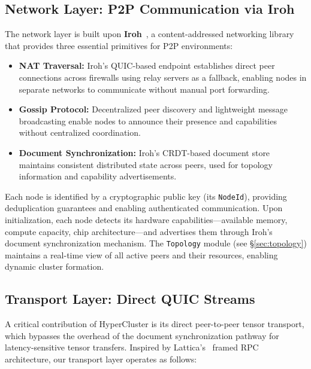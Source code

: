 \documentclass[runningheads]{llncs}
\begin{document}
\subsection{Network Layer: P2P Communication via Iroh}
\label{sec:network}

The network layer is built upon \textbf{Iroh}~\cite{iroh2024}, a content-addressed networking library that provides three essential primitives for P2P environments:

\begin{itemize}
    \item \textbf{NAT Traversal:} Iroh's QUIC-based endpoint establishes direct peer connections across firewalls using relay servers as a fallback, enabling nodes in separate networks to communicate without manual port forwarding.
    \item \textbf{Gossip Protocol:} Decentralized peer discovery and lightweight message broadcasting enable nodes to announce their presence and capabilities without centralized coordination.
    \item \textbf{Document Synchronization:} Iroh's CRDT-based document store maintains consistent distributed state across peers, used for topology information and capability advertisements.
\end{itemize}

Each node is identified by a cryptographic public key (its \texttt{NodeId}), providing deduplication guarantees and enabling authenticated communication. Upon initialization, each node detects its hardware capabilities---available memory, compute capacity, chip architecture---and advertises them through Iroh's document synchronization mechanism. The \texttt{Topology} module (see \S\ref{sec:topology}) maintains a real-time view of all active peers and their resources, enabling dynamic cluster formation.

\subsection{Transport Layer: Direct QUIC Streams}
\label{sec:transport}

A critical contribution of HyperCluster is its direct peer-to-peer tensor transport, which bypasses the overhead of the document synchronization pathway for latency-sensitive tensor transfers. Inspired by Lattica's~\cite{yang2025lattica} framed RPC architecture, our transport layer operates as follows:
\end{document}
